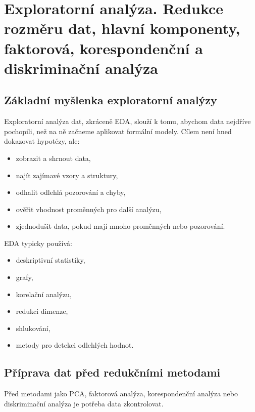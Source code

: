 \section{Exploratorní analýza. Redukce rozměru dat, hlavní komponenty, faktorová, korespondenční a diskriminační analýza}

\subsection{Základní myšlenka exploratorní analýzy}

Exploratorní analýza dat, zkráceně EDA, slouží k tomu, abychom data nejdříve pochopili, než na ně
začneme aplikovat formální modely. Cílem není hned dokazovat hypotézy, ale:
\begin{itemize}
    \item zobrazit a shrnout data,
    \item najít zajímavé vzory a struktury,
    \item odhalit odlehlá pozorování a chyby,
    \item ověřit vhodnost proměnných pro další analýzu,
    \item zjednodušit data, pokud mají mnoho proměnných nebo pozorování.
\end{itemize}

EDA typicky používá:
\begin{itemize}
    \item deskriptivní statistiky,
    \item grafy,
    \item korelační analýzu,
    \item redukci dimenze,
    \item shlukování,
    \item metody pro detekci odlehlých hodnot.
\end{itemize}

\subsection{Příprava dat před redukčními metodami}

Před metodami jako PCA, faktorová analýza, korespondenční analýza nebo diskriminační analýza je potřeba
data zkontrolovat.

